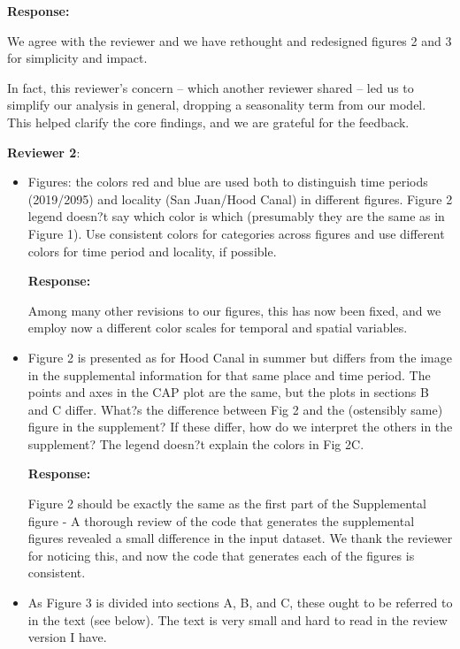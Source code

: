 \documentclass[11pt]{article}
\begin{document}
\begin{linenumbers}
\begin{itemize}
\textbf{Response:}

We agree with the reviewer and we have rethought and redesigned figures 2 and 3 for simplicity and impact. 

In fact, this reviewer's concern -- which another reviewer shared -- led us to simplify our analysis in general, dropping a seasonality term from our model. This helped clarify the core findings, and we are grateful for the feedback. 

\end{itemize}

\vspace*{1em}
\textbf{\large{ Reviewer 2}}: 

\begin{itemize}
\item{Figures: the colors red and blue are used both to distinguish time periods (2019/2095) and locality (San Juan/Hood Canal) in different figures. Figure 2 legend doesn?t say which color is which (presumably they are the same as in Figure 1). Use consistent colors for categories across figures and use different colors for time period and locality, if possible.}

\textbf{Response:}

    Among many other revisions to our figures, this has now been fixed, and we employ now a different color scales for temporal and spatial variables.  
    
\item{Figure 2 is presented as for Hood Canal in summer but differs from the image in the supplemental information for that same place and time period. The points and axes in the CAP plot are the same, but the plots in sections B and C differ. What?s the difference between Fig 2 and the (ostensibly same) figure in the supplement? If these differ, how do we interpret the others in the supplement? The legend doesn?t explain the colors in Fig 2C.} 

\textbf{Response:}

Figure 2 should be exactly the same as the first part of the Supplemental figure - A thorough review of the code that generates the supplemental figures revealed a small difference in the input dataset. We thank the reviewer for noticing this, and now the code that generates each of the figures is consistent.

\item{As Figure 3 is divided into sections A, B, and C, these ought to be referred to in the text (see below). The text is very small and hard to read in the review version I have.}


\end{itemize}
\end{linenumbers}
\end{document}
